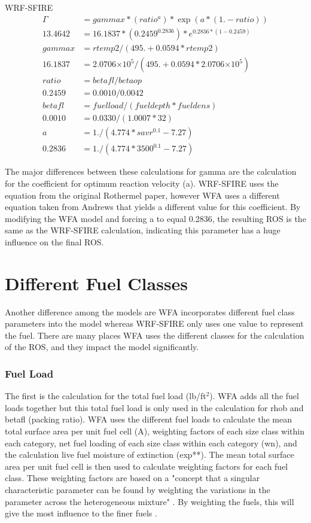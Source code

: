 \documentclass{article}
\newcommand\tenpow[1]{\ensuremath{{\times}10^{#1}}}
\newcommand\und{\textunderscore}
\begin{document}
WRF-SFIRE
\begin{equation}
\label{gamma_WRF}
	\begin{split}
		\Gamma &= gammax*(ratio^a)*\exp(a*(1.-ratio)) \\
		13.4642 &= 16.1837 * (0.2459 ^ {0.2836}) * e^{0.2836 * (1- 0.2459)} \\
		gammax &= rtemp2/(495. + 0.0594*rtemp2) \\
		16.1837 &= 2.0706 \tenpow{5} / (495. + 0.0594* 2.0706 \tenpow{5}) \\
		ratio &= betafl / betaop \\
		0.2459 &= 0.0010 / 0.0042 \\
		betafl &= fuelload/(fueldepth * fueldens) \\
		0.0010 &= 0.0330 / (1.0007 * 32) \\
		a &= 1./(4.774 * savr^{0.1} - 7.27) \\
		0.2836 &= 1./(4.774 * 3500^{0.1} - 7.27)
	\end{split}
\end{equation}

The major differences between these calculations for gamma are the calculation for the coefficient for optimum reaction velocity (a). WRF-SFIRE uses the equation from the original Rothermel paper, however WFA uses a different equation taken from Andrews that yields a different value for this coefficient. By modifying the WFA model and forcing a to equal 0.2836, the resulting ROS is the same as the WRF-SFIRE calculation, indicating this parameter has a huge influence on the final ROS. 

\section{Different Fuel Classes}
Another difference among the models are WFA incorporates different fuel class parameters into the model whereas WRF-SFIRE only uses one value to represent the fuel. There are many places WFA uses the different classes for the calculation of the ROS, and they impact the model significantly. 

\subsubsection{Fuel Load}
 The first is the calculation for the total fuel load (lb/ft$^2$). WFA adds all the fuel loads together but this total fuel load is only used in the calculation for rhob and betafl (packing ratio). WFA uses the different fuel loads to calculate the mean total surface area per unit fuel cell (A\und *), weighting factors of each size class within each category, net fuel loading of each size class within each category (wn\und *), and the calculation live fuel moisture of extinction (exp**). The mean total surface area per unit fuel cell is then used to calculate weighting factors for each fuel class. These weighting factors are based on a "concept that a singular characteristic parameter can be found by weighting the variations in the parameter across the heterogeneous mixture" \citep{Andrews2018}. By weighting the fuels, this will give the most influence to the finer fuels \citep{Andrews2018}. 
\end{document}
